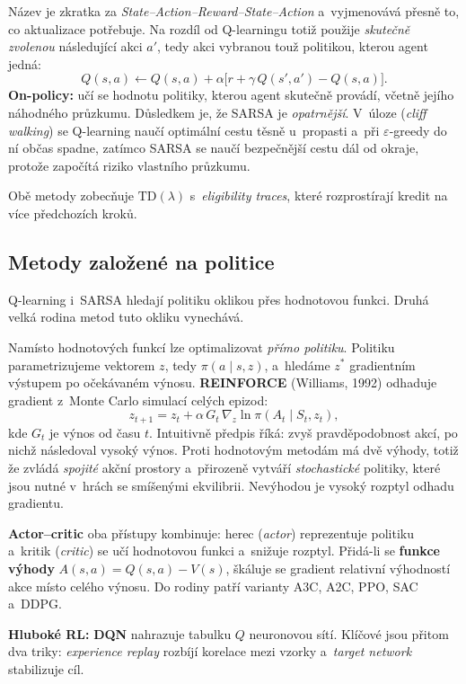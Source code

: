 \documentclass[11pt,a4paper]{article}
\theoremstyle{definition}
\begin{document}
\begin{defbox}[SARSA]
Název je zkratka za \emph{State--Action--Reward--State--Action} a~vyjmenovává přesně to, co
aktualizace potřebuje. Na rozdíl od Q-learningu totiž použije \emph{skutečně zvolenou}
následující akci $a'$, tedy akci vybranou touž politikou, kterou agent jedná:
\[
Q(s,a) \leftarrow Q(s,a) + \alpha\big[r + \gamma\, Q(s',a') - Q(s,a)\big].
\]
\textbf{On-policy:} učí se hodnotu politiky, kterou agent skutečně provádí, včetně jejího
náhodného průzkumu. Důsledkem je, že SARSA je \emph{opatrnější}. V~úloze 
(\emph{cliff walking}) se Q-learning naučí optimální cestu těsně u~propasti a~při
$\varepsilon$-greedy do ní občas spadne, zatímco SARSA se naučí bezpečnější cestu dál od
okraje, protože započítá riziko vlastního průzkumu.

Obě metody zobecňuje $\mathrm{TD}(\lambda)$ s~\emph{eligibility traces}, které rozprostírají
kredit na více předchozích kroků.
\end{defbox}

\subsection{Metody založené na politice}
\label{ssec:policy-metody}

Q-learning i~SARSA hledají politiku oklikou přes hodnotovou funkci. Druhá velká rodina metod
tuto okliku vynechává.

\begin{defbox}
Namísto hodnotových funkcí lze optimalizovat \emph{přímo politiku}. Politiku parametrizujeme
vektorem $z$, tedy $\pi(a \mid s, z)$, a~hledáme $z^*$ gradientním výstupem po očekávaném
výnosu. \textbf{REINFORCE} (Williams, 1992) odhaduje gradient z~Monte Carlo simulací celých
epizod:
\[
z_{t+1} = z_t + \alpha\, G_t\, \nabla_z \ln \pi(A_t \mid S_t, z_t),
\]
kde $G_t$ je výnos od času $t$. Intuitivně předpis říká: zvyš pravděpodobnost akcí, po nichž
následoval vysoký výnos. Proti hodnotovým metodám má dvě výhody, totiž že zvládá \emph{spojité}
akční prostory a~přirozeně vytváří \emph{stochastické} politiky, které jsou nutné v~hrách se
smíšenými ekvilibrii. Nevýhodou je vysoký rozptyl odhadu gradientu.

\textbf{Actor--critic} oba přístupy kombinuje: herec (\emph{actor}) reprezentuje politiku
a~kritik (\emph{critic}) se učí hodnotovou funkci a~snižuje rozptyl. Přidá-li se
\textbf{funkce výhody} $A(s,a) = Q(s,a) - V(s)$, škáluje se gradient relativní výhodností akce
místo celého výnosu.
Do rodiny patří varianty A3C, A2C, PPO, SAC a~DDPG.

\textbf{Hluboké RL:} \textbf{DQN} nahrazuje tabulku $Q$ neuronovou sítí. Klíčové jsou přitom
dva triky: \emph{experience replay} rozbíjí korelace mezi vzorky a~\emph{target network}
stabilizuje cíl.
\end{defbox}
\end{document}
